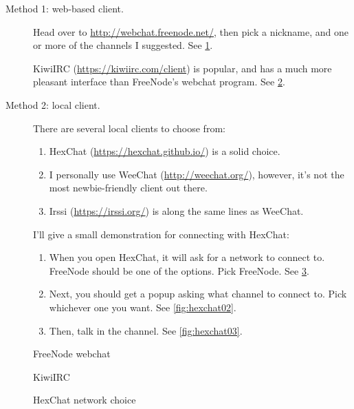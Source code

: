 \begin{description}
\item[Method 1: web-based client.] Head over to
  \url{http://webchat.freenode.net/}, then pick a nickname, and one or
  more of the channels I suggested. See \cref{fig:freenode-webchat}.

  KiwiIRC (\url{https://kiwiirc.com/client}) is popular, and has a
  much more pleasant interface than FreeNode's webchat program. See
  \cref{fig:kiwiirc}.

\item[Method 2: local client.] There are several local clients to
  choose from:

  \begin{enumerate}
  \item HexChat (\url{https://hexchat.github.io/}) is a solid choice.
  \item I personally use WeeChat (\url{http://weechat.org/}), however,
    it's not the most newbie-friendly client out there.
  \item Irssi (\url{https://irssi.org/}) is along the same lines as
    WeeChat.
  \end{enumerate}

  I'll give a small demonstration for connecting with HexChat:

  \begin{enumerate}
  \item When you open HexChat, it will ask for a network to connect
    to. FreeNode should be one of the options. Pick FreeNode. See
    \cref{fig:hexchat01}.
  \item Next, you should get a popup asking what channel to connect
    to. Pick whichever one you want. See \cref{fig:hexchat02}.
  \item Then, talk in the channel. See \cref{fig:hexchat03}.
  \end{enumerate}
\end{description}

\begin{figure}
  \centering
  \caption{FreeNode webchat}
  \label{fig:freenode-webchat}
\end{figure}

\begin{figure}
  \centering
  \caption{KiwiIRC}
  \label{fig:kiwiirc}
\end{figure}

\begin{figure}
  \centering
  \caption{HexChat network choice}
  \label{fig:hexchat01}
\end{figure}

